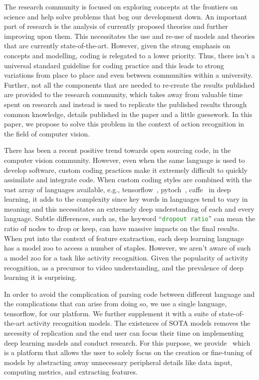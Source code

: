 \documentclass{llncs}
\begin{document}
The research community is focused on exploring concepts at the frontiers on science and help solve problems that bog our development down.
An important part of research is the analysis of currently proposed theories and further improving upon them. 
This necessitates the use and re-use of models and theories that are currently state-of-the-art. 
However, given the strong emphasis on concepts and modelling, coding is relegated to a lower priority.
Thus, there isn't a universal standard guideline for coding practice and this leads to strong variations from place to place and even between communities within a university.
Further, not all the components that are needed to re-create the results published are provided to the research community, which takes away from valuable time spent on research and instead is used to replicate the published results through common knowledge, details published in the paper and a little guesswork.
In this paper, we propose to solve this problem in the context of action recognition in the field of computer vision.

There has been a recent positive trend towards open sourcing code, in the computer vision community.
However, even when the same language is used to develop software, custom coding practices make it extremely difficult to quickly assimilate and integrate code.
When custom coding styles are combined with the vast array of languages available, e.g., tensorflow~\cite{}, pytoch~\cite{}, caffe~\cite{} in deep learning, it adds to the complexity since key words in languages tend to vary in meaning and this necessitates an extremely deep understanding of each and every language.
Subtle differences, such as, the keyword ``\texttt{\textcolor{ForestGreen}{dropout ratio}}'' can mean the ratio of nodes to drop or keep, can have massive impacts on the final results.
When put into the context of feature exatraction, each deep learning language has a model zoo to access a number of staples. However, we aren't aware of such a model zoo for a task like activity recognition. 
Given the popularity of activity recognition, as a precursor to video understanding, and the prevalence of deep learning it is surprising.

In order to avoid the complication of parsing code between different language and the complications that can arise from doing so, we use a single language, tensorflow, for our platform.
We further supplement it with a suite of state-of-the-art activity recognition models.
The existences of SOTA models removes the necessity of replication and the end user can focus their time on implementing deep learning models and conduct research.
For this purpose, we provide \acro~which is a platform that allows the user to solely focus on the creation or fine-tuning of models by abstracting away unnecessary peripheral details like data input, computing metrics, and extracting features.
\end{document}
